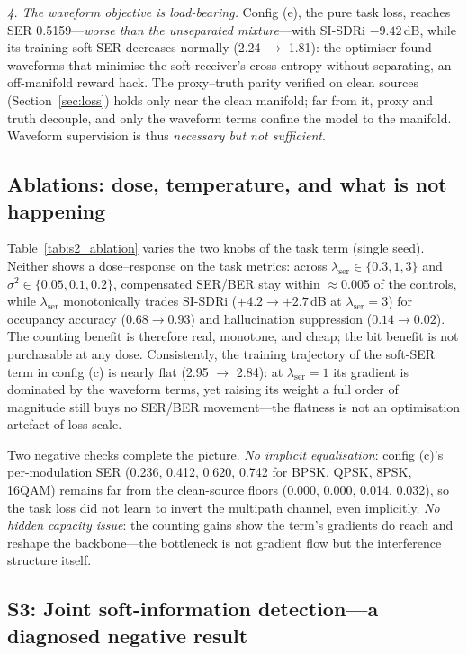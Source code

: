 \documentclass[review,12pt]{elsarticle}
\begin{document}
\emph{4. The waveform objective is load-bearing.} Config (e), the pure
task loss, reaches SER 0.5159---\emph{worse than the unseparated
mixture}---with SI-SDRi $-9.42$\,dB, while its training soft-SER
decreases normally (2.24 $\to$ 1.81): the optimiser found waveforms
that minimise the soft receiver's cross-entropy without separating, an
off-manifold reward hack. The proxy--truth parity verified on clean
sources (Section~\ref{sec:loss}) holds only near the clean manifold;
far from it, proxy and truth decouple, and only the waveform terms
confine the model to the manifold. Waveform supervision is thus
\emph{necessary but not sufficient}.

\subsection{Ablations: dose, temperature, and what is not happening}
\label{sec:abl}

Table~\ref{tab:s2_ablation} varies the two knobs of the task term
(single seed). Neither shows a dose--response on the task metrics:
across $\lambda_{\mathrm{ser}} \in \{0.3, 1, 3\}$ and
$\sigma^2 \in \{0.05, 0.1, 0.2\}$, compensated SER/BER stay within
$\approx$0.005 of the controls, while $\lambda_{\mathrm{ser}}$
monotonically trades SI-SDRi ($+4.2 \to +2.7$\,dB at
$\lambda_{\mathrm{ser}} = 3$) for occupancy accuracy
($0.68 \to 0.93$) and hallucination suppression ($0.14 \to 0.02$).
The counting benefit is therefore real, monotone, and cheap; the bit
benefit is not purchasable at any dose. Consistently, the training
trajectory of the soft-SER term in config (c) is nearly flat
(2.95 $\to$ 2.84): at $\lambda_{\mathrm{ser}} = 1$ its gradient is
dominated by the waveform terms, yet raising its weight a full order of
magnitude still buys no SER/BER movement---the flatness is not an
optimisation artefact of loss scale.



Two negative checks complete the picture. \emph{No implicit
equalisation}: config (c)'s per-modulation SER (0.236, 0.412, 0.620,
0.742 for BPSK, QPSK, 8PSK, 16QAM) remains far from the clean-source
floors (0.000, 0.000, 0.014, 0.032), so the task loss did not learn to
invert the multipath channel, even implicitly. \emph{No hidden capacity issue}:
the counting gains show the term's gradients do reach and reshape the
backbone---the bottleneck is not gradient flow but the interference
structure itself.

\subsection{S3: Joint soft-information detection---a diagnosed negative result}
\label{sec:s3}
\end{document}
